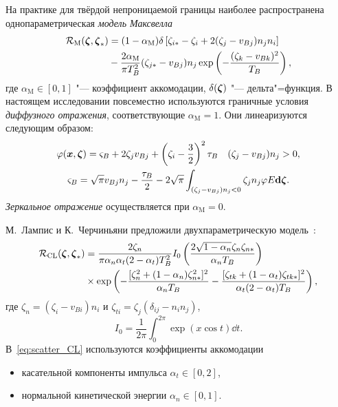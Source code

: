 На практике для твёрдой непроницаемой границы наиболее распространена однопараметрическая \emph{модель Максвелла}
\begin{equation}\label{eq:scatter_Maxwell}
    \begin{aligned}
        \mathcal{R}_\mathrm{M}({\boldsymbol{\zeta}},{\boldsymbol{\zeta}}_*) &= (1-\alpha_\mathrm{M})\delta\left[ \zeta_{i*} - \zeta_i + 2(\zeta_j-v_{Bj})n_jn_i \right] \\
        &-\frac{2\alpha_\mathrm{M}}{\pi T_B^2} (\zeta_{j*}-v_{Bj})n_j \exp\left( -\frac{(\zeta_k-v_{Bk})^2}{T_B} \right),
    \end{aligned}
\end{equation}
где \(\alpha_\mathrm{M}\in[0,1]\) "--- коэффициент аккомодации, \(\delta({\boldsymbol{\zeta}})\) "--- дельта"=функция.
В настоящем исследовании повсеместно используются граничные условия \emph{диффузного отражения},
соответствующие \(\alpha_\mathrm{M}=1\). Они линеаризуются следующим образом:
\begin{equation}\label{eq:linear_diffuse_bc}
    \begin{gathered}
        \varphi({\boldsymbol{x}}, {\boldsymbol{\zeta}}) = \varsigma_B + 2\zeta_j v_{Bj} + \left(\zeta_i-\frac32\right)^2\tau_B
            \quad (\zeta_j-v_{Bj}) n_j > 0, \\
        \varsigma_B = \sqrt\pi v_{Bj}n_j - \frac{\tau_B}2 -2\sqrt\pi
            \int_{(\zeta_j-v_{Bj})n_j < 0} \zeta_j n_j \varphi E\boldsymbol{\mathrm{d}\zeta}.
    \end{gathered}
\end{equation}
\emph{Зеркальное отражение} осуществляется при \(\alpha_\mathrm{M}=0\).

М.~Лампис и К.~Черчиньяни предложили двухпараметрическую модель~\cite{Cercignani1971}:
\begin{equation}\label{eq:scatter_CL}
    \begin{aligned}
        \mathcal{R}_\mathrm{CL}({\boldsymbol{\zeta}},{\boldsymbol{\zeta}}_*) &= \frac{2\zeta_n}{\pi\alpha_n\alpha_t(2-\alpha_t)T_B^2}
            I_0\left( \frac{2\sqrt{1-\alpha_n} \zeta_n\zeta_{n*}}{\alpha_n T_B} \right) \\
        &\times\exp\left(
            -\frac{[\zeta_n^2+(1-\alpha_n)\zeta_{n*}^2]^2}{\alpha_n T_B}
            -\frac{[\zeta_{tk}+(1-\alpha_t)\zeta_{tk*}]^2}{\alpha_t(2-\alpha_t) T_B}
        \right),
    \end{aligned}
\end{equation}
где \(\zeta_n = (\zeta_i-v_{Bi})n_i\) и \(\zeta_{ti} = \zeta_j(\delta_{ij}-n_in_j)\),
\begin{equation}\label{eq:CL_I0}
    I_0 = \frac1{2\pi}\int_0^{2\pi} \exp(x\cos t)\dd{t}.
\end{equation}
В~\eqref{eq:scatter_CL} используются коэффициенты аккомодации
\begin{itemize}
    \item касательной компоненты импульса \(\alpha_t\in[0,2]\),
    \item нормальной кинетической энергии \(\alpha_n\in[0,1]\).
\end{itemize}

